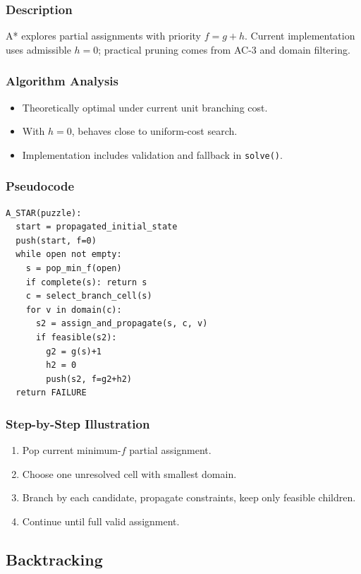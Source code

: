 \documentclass[12pt,a4paper]{article}
\begin{document}
\subsubsection{Description}
A* explores partial assignments with priority $f=g+h$.  
Current implementation uses admissible $h=0$; practical pruning comes from AC-3 and domain filtering.

\subsubsection{Algorithm Analysis}
\begin{itemize}
    \item Theoretically optimal under current unit branching cost.
    \item With $h=0$, behaves close to uniform-cost search.
    \item Implementation includes validation and fallback in \texttt{solve()}.
\end{itemize}

\subsubsection{Pseudocode}
\begin{lstlisting}[style=pseudostyle, caption={A* Search}]
A_STAR(puzzle):
  start = propagated_initial_state
  push(start, f=0)
  while open not empty:
    s = pop_min_f(open)
    if complete(s): return s
    c = select_branch_cell(s)
    for v in domain(c):
      s2 = assign_and_propagate(s, c, v)
      if feasible(s2):
        g2 = g(s)+1
        h2 = 0
        push(s2, f=g2+h2)
  return FAILURE
\end{lstlisting}

\subsubsection{Step-by-Step Illustration}
\begin{enumerate}
    \item Pop current minimum-$f$ partial assignment.
    \item Choose one unresolved cell with smallest domain.
    \item Branch by each candidate, propagate constraints, keep only feasible children.
    \item Continue until full valid assignment.
\end{enumerate}

\subsection{Backtracking}
\end{document}
